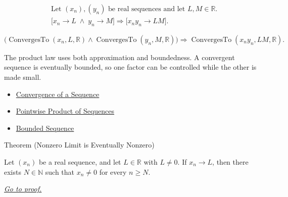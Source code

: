 \begin{remark*}
\[
\begin{aligned}
&\text{Let } (x_n),(y_n) \text{ be real sequences and let } L,M\in\mathbb{R}.\\
&\bigl[
x_n\to L \;\land\; y_n\to M
\bigr]
\Longrightarrow
\bigl[
x_ny_n\to LM
\bigr].
\end{aligned}
\]
\end{remark*}

\begin{remark*}
\[
\bigl(
\operatorname{ConvergesTo}(x_n,L,\mathbb{R})
\land
\operatorname{ConvergesTo}(y_n,M,\mathbb{R})
\bigr)
\Longrightarrow
\operatorname{ConvergesTo}(x_ny_n,LM,\mathbb{R}).
\]
\end{remark*}

\begin{remark*}[Interpretation]
The product law uses both approximation and boundedness. A convergent sequence
is eventually bounded, so one factor can be controlled while the other is made
small.
\end{remark*}

\begin{dependencies}
\begin{itemize}
  \item \hyperref[def:convergent-sequence]{Convergence of a Sequence}
  \item \hyperref[def:pointwise-product-sequence]{Pointwise Product of Sequences}
  \item \hyperref[def:bounded-sequence]{Bounded Sequence}
\end{itemize}
\end{dependencies}


\begin{theorembox}{Theorem (Nonzero Limit is Eventually Nonzero)}
\begin{theorem}
\label{thm:nonzero-limit-eventually-nonzero}
Let $(x_n)$ be a real sequence, and let $L\in\mathbb{R}$ with $L\neq 0$.
If $x_n\to L$, then there exists $N\in\mathbb{N}$ such that $x_n\neq 0$
for every $n\ge N$.

\smallskip
\noindent
\hyperref[prf:nonzero-limit-eventually-nonzero]{\textit{Go to proof.}}
\end{theorem}
\end{theorembox}

